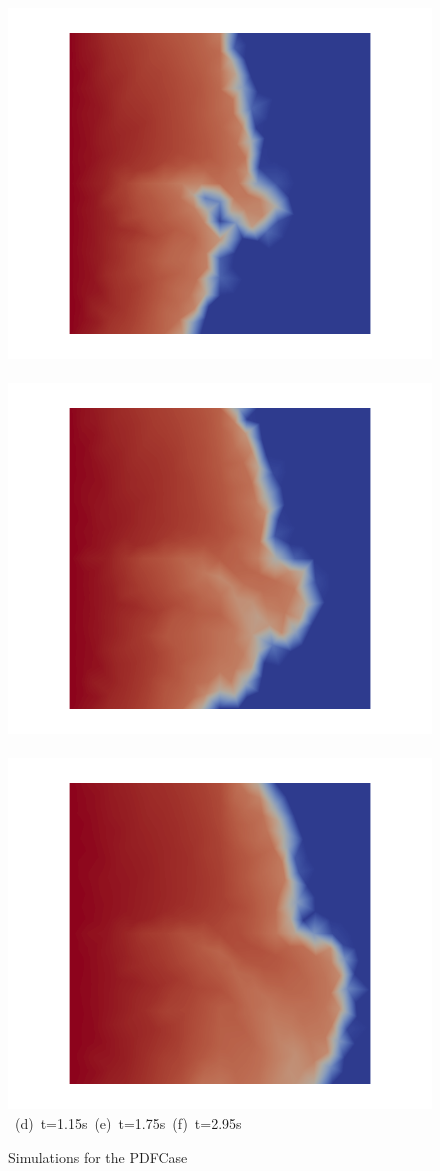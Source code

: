 \begin{landscape}
\begin{figure}[ht]
{\hbox{
      \includegraphics[width=.56\textwidth]{./Pics/PDFCase/PDFCase_Saturation_t_1dot15.png}
      \includegraphics[width=.56\textwidth]{./Pics/PDFCase/PDFCase_Saturation_t_1dot75.png} 
      \includegraphics[width=.56\textwidth]{./Pics/PDFCase/PDFCase_Saturation_t_2dot95.png}}
\vspace{0.cm}
\hbox{ \hspace{2.5cm} (d) t=1.15s \hspace{5.5cm} (e) t=1.75s   \hspace{5.5cm} (f) t=2.95s}
\vspace{0.cm}
}   
\caption{Simulations for the PDFCase}
\label{fig:PDFCase_Saturation}
\end{figure}
\end{landscape}
\clearpage



